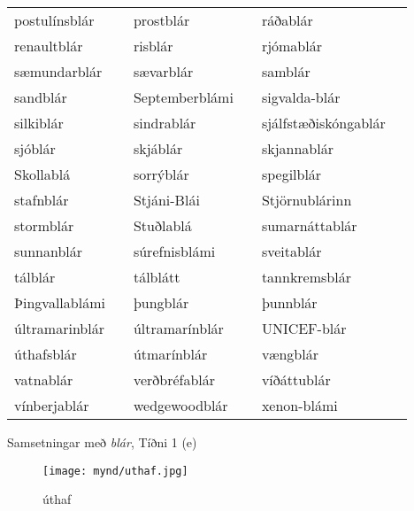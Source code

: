 \documentclass[../samsetningasafn.tex]{subfiles}
\begin{document}
\begin{wordlist}[H]
\begin{tcolorbox}

	\setlength{\extrarowheight}{3pt}
	\begin{tabular}{BlBlBl}			
		postulínsblár		&		& 
		prostblár		&		& 
		ráðablár			&		\\  %
		renaultblár		&		& 
		risblár			&		& 
		rjómablár		&		\\  %
		sæmundarblár	&		& 
		sævarblár		&		& 
		samblár			&		\\  %
		sandblár			&		& 
		Septemberblámi	&		& 
		sigvalda-blár		&		\\ 
		silkiblár			&		& 
		sindrablár		&		& 
		sjálfstæðiskóngablár &	\\ 
		sjóblár			&		& 
		skjáblár			&		& 
		skjannablár		&		\\ 
		Skollablá		&		& 
		sorrýblár		&		& 
		spegilblár		&		\\ 
		stafnblár		&		& 
		Stjáni-Blái		&		& 
		Stjörnublárinn	&		\\ 
		stormblár		&		& 
		Stuðlablá		&		& 
		sumarnáttablár	&		\\ 
		sunnanblár		&		& 
		súrefnisblámi	&		& 
		sveitablár		&		\\ 
		tálblár			&		& 
		tálblátt			&		& 
		tannkremsblár	&		\\ 
		Þingvallablámi	&		& 
		þungblár		&		& 
		þunnblár		&		\\ 
		últramarinblár	&		& 
		últramarínblár	&		& 
		UNICEF-blár		&		\\ 
		úthafsblár		&		& 
		útmarínblár		&		& 
		vængblár		& 		\\ 
		vatnablár		&		& 
		verðbréfablár	&		& 
		víðáttublár		&		\\ 
		vínberjablár		&		& 
		wedgewoodblár	&		& 
		xenon-blámi		&		 
\end{tabular}

\end{tcolorbox}
	\caption{Samsetningar með \textit{blár}, Tíðni 1 (e)}
	\label{listi:svart.1e}
\end{wordlist}	

\begin{figure}[H]
\begin{tcolorbox}
\centering
	\texttt{[image: mynd/uthaf.jpg]}
\end{tcolorbox}
	\caption{úthaf}
	\label{mynd:uthaf}
\end{figure}
\end{document}
